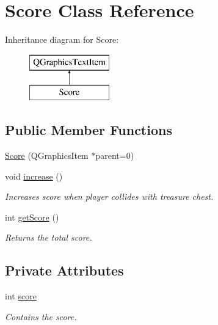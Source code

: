 \hypertarget{class_score}{}\section{Score Class Reference}
\label{class_score}
Inheritance diagram for Score\+:\begin{figure}[H]
\begin{center}
\leavevmode
\includegraphics[height=2.000000cm]{class_score}
\end{center}
\end{figure}
\subsection*{Public Member Functions}
\begin{DoxyCompactItemize}
\item 
\hyperlink{class_score_af7c3392a27388a66b8a94448a995634d}{Score} (Q\+Graphics\+Item $\ast$parent=0)
\item 
void \hyperlink{class_score_ab5dbfab6935903c075509546878cfbda}{increase} ()
\begin{DoxyCompactList}\small\item\em Increases score when player collides with treasure chest. \end{DoxyCompactList}\item 
int \hyperlink{class_score_a8627c93270c188a3fd28a25b1d07a9e7}{get\+Score} ()
\begin{DoxyCompactList}\small\item\em Returns the total score. \end{DoxyCompactList}\end{DoxyCompactItemize}
\subsection*{Private Attributes}
\begin{DoxyCompactItemize}
\item 
int \hyperlink{class_score_a331b0927105c83ba760954eff6cf9fe9}{score}\hypertarget{class_score_a331b0927105c83ba760954eff6cf9fe9}{}\label{class_score_a331b0927105c83ba760954eff6cf9fe9}

\begin{DoxyCompactList}\small\item\em Contains the score. \end{DoxyCompactList}\end{DoxyCompactItemize}


